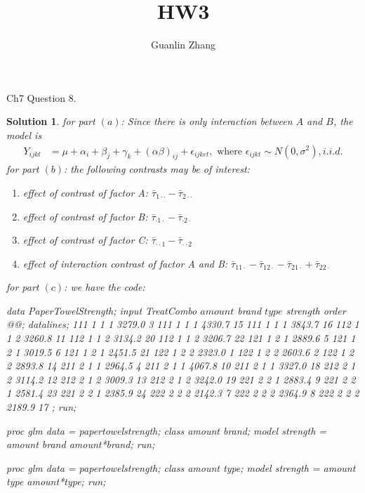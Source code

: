 \documentclass[11pt]{article}
\title{HW3}
\author{Guanlin Zhang}
\newtheorem{sol}{Solution}
\begin{document}
Ch7 Question $8$.
\begin{sol}
	for part $(a)$:\vskip 2mm
	Since there is only interaction between $A$ and $B$, the model is
	\begin{align*}
		Y_{ijkt}&= \mu + \alpha_i + \beta_j + \gamma_k + (\alpha\beta)_{ij} + \epsilon_{ijket}, \text{ where }\epsilon_{ijkt} \sim N(0, \sigma^2), i.i.d.
	\end{align*}
	for part $(b)$:\vskip 2mm
	the following contrasts may be of interest:
	\begin{enumerate}
		\item effect of contrast of factor A: $\bar{\tau}_{1\cdot\cdot} -\bar{\tau}_{2\cdot\cdot}$
		\item effect of contrast of factor B: $\bar{\tau}_{\cdot 1\cdot} -\bar{\tau}_{\cdot 2\cdot}$ 
		\item effect of contrast of factor C: $\bar{\tau}_{\cdot \cdot 1} -\bar{\tau}_{\cdot\cdot 2}$
		\item effect of interaction contrast of factor A and B: $\bar{\tau}_{11\cdot} - \bar{\tau}_{12\cdot} - \bar{\tau}_{21\cdot} + \bar{\tau}_{22\cdot}$
	\end{enumerate}
	for part $(c)$:\vskip 2mm
	we have the code:
	\begin{Datastep}
		data PaperTowelStrength;
	input TreatCombo $ amount $ brand $ type $ strength order @@;
	datalines;
	 111 1 1 1 3279.0  3  111 1 1 1 4330.7 15  111 1 1 1 3843.7 16
	 112 1 1 2 3260.8 11  112 1 1 2 3134.2 20  112 1 1 2 3206.7 22
	 121 1 2 1 2889.6  5  121 1 2 1 3019.5  6  121 1 2 1 2451.5 21
	 122 1 2 2 2323.0  1  122 1 2 2 2603.6  2  122 1 2 2 2893.8 14
	 211 2 1 1 2964.5  4  211 2 1 1 4067.8 10  211 2 1 1 3327.0 18
	 212 2 1 2 3114.2 12  212 2 1 2 3009.3 13  212 2 1 2 3242.0 19
	 221 2 2 1 2883.4  9  221 2 2 1 2581.4 23  221 2 2 1 2385.9 24
	 222 2 2 2 2142.3  7  222 2 2 2 2364.9  8  222 2 2 2 2189.9 17
	;
run;

proc glm data = papertowelstrength;
	class amount brand;
	model strength = amount brand amount*brand;
run;

proc glm data = papertowelstrength;
	class amount type;
	model strength = amount type amount*type;
run;


\end{Datastep}
\end{sol}
\end{document}
